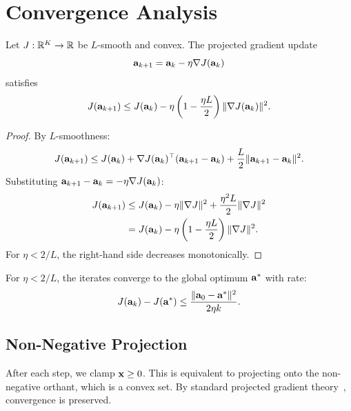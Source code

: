 \section{Convergence Analysis}
\label{app:convergence}

\begin{proposition}
Let $J: \mathbb{R}^K \to \mathbb{R}$ be $L$-smooth and convex. The projected gradient 
update
\begin{equation}
    \mathbf{a}_{k+1} = \mathbf{a}_k - \eta \nabla J(\mathbf{a}_k)
\end{equation}
satisfies
\begin{equation}
    J(\mathbf{a}_{k+1}) \le J(\mathbf{a}_k) - \eta \left(1 - \frac{\eta L}{2}\right) 
    \|\nabla J(\mathbf{a}_k)\|^2.
\end{equation}
\end{proposition}

\begin{proof}
By $L$-smoothness:
\begin{equation}
    J(\mathbf{a}_{k+1}) \le J(\mathbf{a}_k) + \nabla J(\mathbf{a}_k)^\top 
    (\mathbf{a}_{k+1} - \mathbf{a}_k) + \frac{L}{2} \|\mathbf{a}_{k+1} - \mathbf{a}_k\|^2.
\end{equation}
Substituting $\mathbf{a}_{k+1} - \mathbf{a}_k = -\eta \nabla J(\mathbf{a}_k)$:
\begin{align}
    J(\mathbf{a}_{k+1}) &\le J(\mathbf{a}_k) - \eta \|\nabla J\|^2 
    + \frac{\eta^2 L}{2} \|\nabla J\|^2 \\
    &= J(\mathbf{a}_k) - \eta \left(1 - \frac{\eta L}{2}\right) \|\nabla J\|^2.
\end{align}
For $\eta < 2/L$, the right-hand side decreases monotonically.
\end{proof}

\begin{corollary}
For $\eta < 2/L$, the iterates converge to the global optimum 
$\mathbf{a}^*$ with rate:
\begin{equation}
    J(\mathbf{a}_k) - J(\mathbf{a}^*) \le \frac{\|\mathbf{a}_0 - \mathbf{a}^*\|^2}{2\eta k}.
\end{equation}
\end{corollary}

\subsection{Non-Negative Projection}

After each step, we clamp $\mathbf{x} \ge 0$. This is equivalent to 
projecting onto the non-negative orthant, which is a convex set. 
By standard projected gradient theory~\cite{bertsekas1999nonlinear}, 
convergence is preserved.